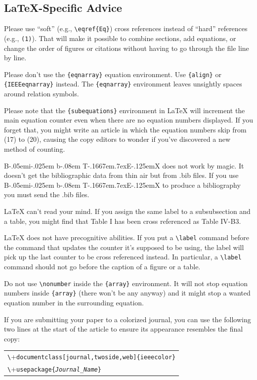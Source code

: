 \documentclass[twoside,web]{ieeecolor}
\def\BibTeX{{\rm B\kern-.05em{\sc i\kern-.025em b}\kern-.08em
    T\kern-.1667em\lower.7ex\hbox{E}\kern-.125emX}}
\begin{document}
\subsection{\LaTeX-Specific Advice}

Please use ``soft'' (e.g., \verb|\eqref{Eq}|) cross references instead
of ``hard'' references (e.g., \verb|(1)|). That will make it possible
to combine sections, add equations, or change the order of figures or
citations without having to go through the file line by line.

Please don't use the \verb|{eqnarray}| equation environment. Use
\verb|{align}| or \verb|{IEEEeqnarray}| instead. The \verb|{eqnarray}|
environment leaves unsightly spaces around relation symbols.

Please note that the \verb|{subequations}| environment in {\LaTeX}
will increment the main equation counter even when there are no
equation numbers displayed. If you forget that, you might write an
article in which the equation numbers skip from (17) to (20), causing
the copy editors to wonder if you've discovered a new method of
counting.

{\BibTeX} does not work by magic. It doesn't get the bibliographic
data from thin air but from .bib files. If you use {\BibTeX} to produce a
bibliography you must send the .bib files. 

{\LaTeX} can't read your mind. If you assign the same label to a
subsubsection and a table, you might find that Table I has been cross
referenced as Table IV-B3. 

{\LaTeX} does not have precognitive abilities. If you put a
\verb|\label| command before the command that updates the counter it's
supposed to be using, the label will pick up the last counter to be
cross referenced instead. In particular, a \verb|\label| command
should not go before the caption of a figure or a table.

Do not use \verb|\nonumber| inside the \verb|{array}| environment. It
will not stop equation numbers inside \verb|{array}| (there won't be
any anyway) and it might stop a wanted equation number in the
surrounding equation.

If you are submitting your paper to a colorized journal, you can use
the following two lines at the start of the article to ensure its
appearance resembles the final copy:

\smallskip\noindent
\begin{small}
\begin{tabular}{l}
\verb+\+\texttt{documentclass[journal,twoside,web]\{ieeecolor\}}\\
\verb+\+\texttt{usepackage\{\textit{Journal\_Name}\}}
\end{tabular}
\end{small}
\end{document}
